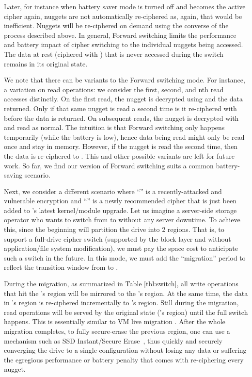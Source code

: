 Later, for instance when battery saver mode is turned off and \cone becomes the
active cipher again, nuggets are not automatically re-ciphered as, again, that
would be inefficient. Nuggets will be re-ciphered on demand using the converse
of the process described above. In general, Forward switching limits the
performance and battery impact of cipher switching to the individual nuggets
being accessed. The data at rest (ciphered with \cone) that is never accessed
during the switch remains in its original state.

We note that there can be variants to the Forward switching mode. For instance,
a variation on read operations: we consider the first, second, and nth read
accesses distinctly. On the first read, the nugget is decrypted using \cone and
the data returned. Only if that same nugget is read a second time is it
re-ciphered with \ctwo before the data is returned. On subsequent reads, the
nugget is decrypted with \ctwo and read as normal. The intuition is that Forward
switching only happens temporarily (\eg while the battery is low), hence data
being read might only be read once and stay in memory. However, if the nugget is
read the second time, then the data is re-ciphered to \ctwo. This and other
possible variants are left for future work. So far, we find our version of
Forward switching suits a common battery-saving scenario.



 Next, we consider a different scenario where
``\cone'' is a recently-attacked and vulnerable encryption and ``\ctwo'' is a
newly recommended cipher that is just been added to \sys's latest kernel/module
upgrade. Let us imagine a server-side storage operator who wants to switch from
\cone to \ctwo without any server downtime. To achieve this, \sys since the
beginning will partition the drive into 2 regions. That is, to support a
full-drive cipher switch (supported by the block layer and without
application/file system modification), we must pay the space cost to anticipate
such a switch in the future. In this mode, we must add the ``migration'' period
to reflect the transition window from \cone to \ctwo.

During the migration, as summarized in Table \cref{tbl:switch}, all write
operations that hit the \cone's region will be mirrored to the \ctwo's region.
At the same time, the data in \cone's region is re-ciphered incrementally to
\ctwo's region. Still during the migration, read operations will be served by
the original state (\cone's region) until the full switch happens. This is
essentially similar to VM live migration \cite{live-vm-migration}. After
the whole migration completes, to fully secure-erase the previous region, one
can use a mechanism such as SSD Instant/Secure Erase~\cite{ISE1,ISE2,ISE3}, thus
quickly and securely converging the drive to a single configuration without
losing any data or suffering the egregious performance or battery penalty that
comes with re-ciphering every nugget.


